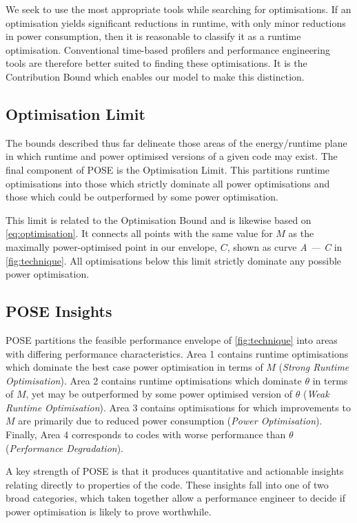 \noindent
We seek to use the most appropriate tools while searching for optimisations.
If an optimisation yields significant reductions in runtime, with only minor reductions in power consumption, then it is reasonable to classify it as a runtime optimisation.
Conventional time-based profilers and performance engineering tools are therefore better suited to finding these optimisations.
It is the Contribution Bound which enables our model to make this distinction.

\subsection{Optimisation Limit}
\noindent
The bounds described thus far delineate those areas of the energy/runtime plane in which runtime and power optimised versions of a given code may exist.
The final component of POSE is the Optimisation Limit.
This partitions runtime optimisations into those which strictly dominate all power optimisations and those which could be outperformed by some power optimisation.

This limit is related to the Optimisation Bound and is likewise based on \autoref{eq:optimisation}.
It connects all points with the same value for $M$ as the maximally power-optimised point in our envelope, $C$, shown as curve \emph{A --- C} in \autoref{fig:technique}.
All optimisations below this limit strictly dominate any possible power optimisation.

\subsection{POSE Insights}
\noindent
POSE partitions the feasible performance envelope of \autoref{fig:technique} into areas with differing performance characteristics.
Area 1 contains runtime optimisations which dominate the best case power optimisation in terms of $M$ (\emph{Strong Runtime Optimisation}).
Area 2 contains runtime optimisations which dominate $\theta$ in terms of $M$, yet may be outperformed by some power optimised version of $\theta$ (\emph{Weak Runtime Optimisation}).
Area 3 contains optimisations for which improvements to $M$ are primarily due to reduced power consumption (\emph{Power Optimisation}).
Finally, Area 4 corresponds to codes with worse performance than $\theta$ (\emph{Performance Degradation}).

A key strength of POSE is that it produces quantitative and actionable insights relating directly to properties of the code.
These insights fall into one of two broad categories, which taken together allow a performance engineer to decide if power optimisation is likely to prove worthwhile.

